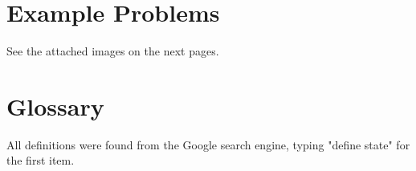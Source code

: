 \documentclass[12pt]{article}
\begin{document}
\section{Example Problems}

See the attached images on the next pages.

% 

\section{Glossary}

All definitions were found from the Google search engine, typing "define state" for the first item.
\end{document}
